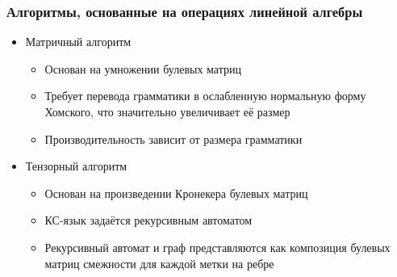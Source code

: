 \documentclass[x11names,dvipsnames,table,aspectratio=169]{beamer}
\begin{document}
\begin{frame}
  \transwipe[direction=90]
  \frametitle{Алгоритмы, основанные на операциях линейной алгебры}
  \begin{itemize}
    \item Матричный алгоритм
    \begin{itemize}
        \item Основан на умножении булевых матриц
        \item Требует перевода грамматики в ослабленную нормальную форму Хомского, что значительно увеличивает её размер
        \item Производительность зависит от размера грамматики
    \end{itemize}
    \item Тензорный алгоритм
    \begin{itemize}
        \item Основан на произведении Кронекера булевых матриц
        \item КС-язык задаётся рекурсивным автоматом
        \item Рекурсивный автомат и граф представляются как композиция булевых матриц смежности для каждой метки на ребре
    \end{itemize}
  \end{itemize}

\end{frame}
\end{document}
